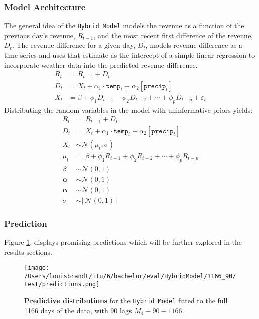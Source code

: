 \subsubsection{Model Architecture}
The general idea of the \texttt{Hybrid Model} models the revenue as a function
of the previous day's revenue, $R_{t-1}$, and the most recent first difference of the
revenue, $D_t$. The revenue difference for a given day, $D_t$, models revenue
difference as a time series and uses that estimate as the intercept of a simple
linear regression to incorporate weather data into the predicted revenue
difference.
\begin{equation}
  \label{eq:hybrid_model}
  \begin{split}
    R_t &= R_{t-1} + D_t \\
    D_t &= X_t + \alpha_1 \cdot \texttt{temp}_t + \alpha_2[\texttt{precip}_t] \\
    X_t &= \beta + \phi_1 D_{t-1} + \phi_2 D_{t-2} + \cdots + \phi_p D_{t-p} + \varepsilon_t
  \end{split}
\end{equation}
Distributing the random variables in the model with uninformative priors yields:
\begin{equation}
  \begin{split}
    R_t &= R_{t-1} + D_t \\
    D_t &= X_t + \alpha_1 \cdot \texttt{temp}_t + \alpha_2[\texttt{precip}_t] \\
    X_t &\sim \mathcal{N}(\mu_t, \sigma) \\
    \mu_t &= \beta + \phi_1 R_{t-1} + \phi_2 R_{t-2} + \cdots + \phi_p R_{t-p} \\
    \beta &\sim \mathcal{N}(0, 1) \\
    \boldsymbol{\phi} &\sim \mathcal{N}(0, 1) \\
    \boldsymbol{\alpha} &\sim \mathcal{N}(0, 1) \\
    \sigma &\sim \left| \ \mathcal{N}(0,1) \ \right|
  \end{split}
\end{equation}

\subsubsection{Prediction}
Figure \ref{fig:hybrid_model_predictions}, displays promising predictions which 
will be further explored in the results sections.

\begin{figure}[h]
  \centering
  \texttt{[image: /Users/louisbrandt/itu/6/bachelor/eval/HybridModel/1166\_90/test/predictions.png]}
  \caption{\textbf{Predictive distributions} for the \texttt{Hybrid Model} fitted to the full 1166 days of the data, with 90 lags $M_{4}{-}90{-}1166$.}
  \label{fig:hybrid_model_predictions}
\end{figure}

